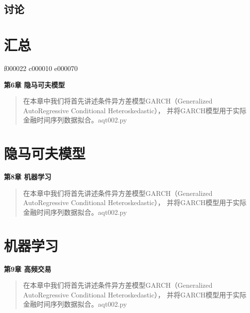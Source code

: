 \documentclass{article}
\begin{document}
\subsection{讨论}





\section{汇总}
f000022
c000010
e000070






\maketitle\begin{center}
\Large \textbf{第6章 隐马可夫模型}
\end{center}
\begin{abstract}
在本章中我们将首先讲述条件异方差模型GARCH（Generalized AutoRegressive Conditional Heteroskedastic），
并将GARCH模型用于实际金融时间序列数据拟合。aqt002.py
\end{abstract}
\section{隐马可夫模型}



\maketitle\begin{center}
\Large \textbf{第8章 机器学习}
\end{center}
\begin{abstract}
在本章中我们将首先讲述条件异方差模型GARCH（Generalized AutoRegressive Conditional Heteroskedastic），
并将GARCH模型用于实际金融时间序列数据拟合。aqt002.py
\end{abstract}
\section{机器学习}

\maketitle\begin{center}
\Large \textbf{第9章 高频交易}
\end{center}
\begin{abstract}
在本章中我们将首先讲述条件异方差模型GARCH（Generalized AutoRegressive Conditional Heteroskedastic），
并将GARCH模型用于实际金融时间序列数据拟合。aqt002.py
\end{abstract}
\end{document}
